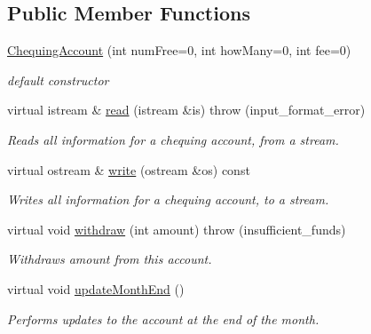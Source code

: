 \subsection*{Public Member Functions}
\begin{CompactItemize}
\item 
\hyperlink{classChequingAccount_abe675fa503c8abfdee3913d35b52197}{ChequingAccount} (int numFree=0, int howMany=0, int fee=0)
\begin{CompactList}\small\item\em default constructor \item\end{CompactList}\item 
virtual istream \& \hyperlink{classChequingAccount_b0aaf92f019e79f95c39a0f6996acbf5}{read} (istream \&is)  throw (input\_\-format\_\-error)
\begin{CompactList}\small\item\em Reads all information for a chequing account, from a stream. \item\end{CompactList}\item 
virtual ostream \& \hyperlink{classChequingAccount_b85b405548099388a5d7866ed9065d33}{write} (ostream \&os) const 
\begin{CompactList}\small\item\em Writes all information for a chequing account, to a stream. \item\end{CompactList}\item 
virtual void \hyperlink{classChequingAccount_14b54359ca8a5260b7decf0aa9bb04d2}{withdraw} (int amount)  throw (insufficient\_\-funds)
\begin{CompactList}\small\item\em Withdraws {\em amount\/} from this account. \item\end{CompactList}\item 
virtual void \hyperlink{classChequingAccount_03a0e06869ce9180c4e7ef2fdb39e616}{updateMonthEnd} ()
\begin{CompactList}\small\item\em Performs updates to the account at the end of the month. \item\end{CompactList}\end{CompactItemize}
